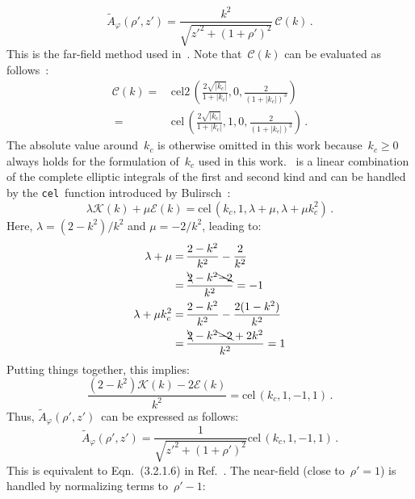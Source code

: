 \begin{equation}
  \tilde{A}_\varphi(\rho', z')
  = \frac{k^2}{\sqrt{z'^2 + (1 + \rho')^2}} \,\mathcal{C}(k)\, .
\end{equation}
This is the far-field method used in~.
Note that~$\mathcal{C}(k)$ can be evaluated as follows~\cite{bulirsch_1, bulirsch_3}:
\begin{align}
  \mathcal{C}(k) =&\, \textrm{cel2}\,\left(\frac{2 \sqrt{|k_c|}}{1+|k_c|},0,\frac{2}{(1+|k_c|)^3}\right) \nonumber \\
       ~         =&\, \textrm{cel}\,\left(\frac{2 \sqrt{|k_c|}}{1+|k_c|},1,0,\frac{2}{(1+|k_c|)^3}\right) \, .
\end{align}
The absolute value around~$k_c$ is otherwise omitted in this work
because~$k_c \geq 0$ always holds for the formulation of~$k_c$ used in this work.
~is a linear combination of the complete elliptic integrals
of the first and second kind and can be handled by the \texttt{cel}~function
introduced by Bulirsch~\cite{bulirsch_3}:
\begin{equation}
  \lambda \mathcal{K} (k) + \mu \mathcal{E} (k) = \textrm{cel}\,(k_c, 1, \lambda + \mu, \lambda + \mu k_c^2) \, .
\end{equation}
Here, $\lambda = (2 - k^2)/k^2$ and $\mu = -2/k^2$,
leading to:
\begin{align}
  \lambda + \mu       =&\, \frac{2 - k^2}{k^2} - \frac{2}{k^2} \nonumber \\
      ~               =&\, \frac{\bcancel{2} - k^2 \bcancel{-2}}{k^2} = -1 \nonumber \\
  \lambda + \mu k_c^2 =&\, \frac{2 - k^2}{k^2} - \frac{2 (1 - k^2)}{k^2} \nonumber \\
      ~               =&\, \frac{\bcancel{2} - k^2 \bcancel{-2} + 2 k^2}{k^2} = 1
\end{align}
Putting things together, this implies:
\begin{equation}
 \frac{(2 - k^2)\mathcal{K}(k) - 2 \mathcal{E}(k)}{k^2} = \textrm{cel}\,(k_c, 1, -1, 1) \, . \label{eqn:cel_kc_1}
\end{equation}
Thus, $\tilde{A}_\varphi(\rho',z')$~can be expressed as follows:
\begin{equation}
 \tilde{A}_\varphi(\rho',z')
 = \frac{1}{\sqrt{z'^2 + (1 + \rho')^2}}
   \textrm{cel}\,(k_c, 1, -1, 1) \, . \label{eqn:cwl_A_phi_using_cel}
\end{equation}
This is equivalent to Eqn.~(3.2.1.6) in Ref.~\cite{teal}.
The near-field (close to~$\rho' = 1$) is handled by normalizing terms to~$\rho'-1$:
